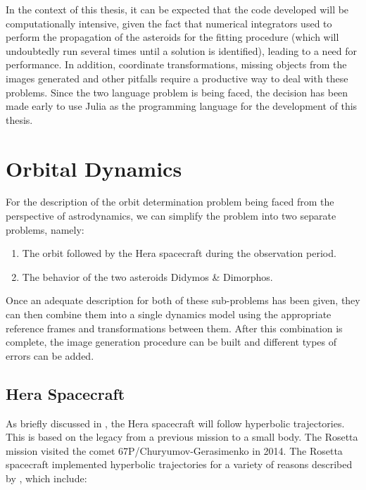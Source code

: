 In the context of this thesis, it can be expected that the code developed will be computationally intensive, given the fact that numerical integrators used to perform the propagation of the asteroids for the fitting procedure (which will undoubtedly run several times until a solution is identified), leading to a need for performance. In addition, coordinate transformations, missing objects from the images generated and other pitfalls require a productive way to deal with these problems. Since the two language problem is being faced, the decision has been made early to use Julia as the programming language for the development of this thesis.

\section{Orbital Dynamics}

For the description of the orbit determination problem being faced from the perspective of astrodynamics, we can simplify the problem into two separate problems, namely:

\begin{enumerate}
	\item The orbit followed by the Hera spacecraft during the observation period.
	\item The behavior of the two asteroids Didymos \& Dimorphos.
\end{enumerate}

Once an adequate description for both of these sub-problems has been given, they can then combine them into a single dynamics model using the appropriate reference frames and transformations between them. After this combination is complete, the image generation procedure can be built and different types of errors can be added.  
   
   
\subsection{Hera Spacecraft}

As briefly discussed in %
, the Hera spacecraft will follow hyperbolic trajectories. This is based on the legacy from a previous mission to a small body. The Rosetta mission visited the comet 67P/Churyumov-Gerasimenko in 2014. The Rosetta spacecraft implemented hyperbolic trajectories for a variety of reasons described by \citeauthor{rosetta-orbit} \cite{rosetta-orbit}, which include:

